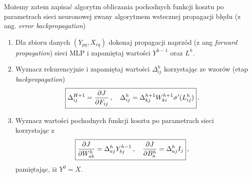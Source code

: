 \documentclass{myclass}
\begin{document}
Możemy zatem zapisać algorytm obliczania pochodnych funkcji kosztu po parametrach sieci neuronowej
zwany algorytmem wstecznej propagacji błędu (z ang. \textit{error backpropagation})

\begin{tcolorbox}[title=Algorytm wstecznej propagacji błędu]
    \begin{enumerate}
        \item Dla zbioru danych \((Y_{pq}, X_{rq})\) dokonaj propagacji naprzód (z ang
        \textit{forward propagation}) sieci MLP i zapamiętaj wartości \(Y^{h-1}\) oraz \(L^h\).

        \item Wyznacz rekurencyjnie i zapamiętaj wartości \(\Delta_{ij}^h\) korzystając ze wzorów
        (etap \textit{backpropagation})
        \begin{equation*}
            \boxed{\Delta_{ij}^{H+1} = \pdv{J}{F_{ij}}\,,\quad \Delta_{ij}^h = \Delta_{kj}^{h+1}W_{ki}^{h+1}\sigma'(L_{ij}^h)}\,.
        \end{equation*}

        \item Wyznacz wartości pochodnych funkcji kosztu po parametrach sieci korzystając z
        \begin{equation*}
            \boxed{\pdv{J}{W_{ab}^h} = \Delta_{aj}^h Y_{bj}^{h-1}\,,\quad \pdv{J}{B_a^h} = \Delta_{aj}^hI_j}\,,
        \end{equation*}
        pamiętając, iż \(Y^0 = X\).
    \end{enumerate}
\end{tcolorbox}
\end{document}
